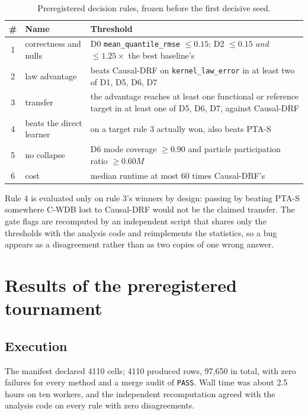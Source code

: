 \documentclass[11pt,a4paper]{article}
\theoremstyle{definition}
\theoremstyle{remark}
\newcommand{\CWDB}{\textsf{C-WDB}}
\begin{document}
\begin{table}[htbp]
\centering
\caption{Preregistered decision rules, frozen before the first decisive seed.}
\label{tab:rules}
\small
\begin{tabular}{@{}clp{9.4cm}@{}}
\toprule
\# & Name & Threshold \\
\midrule
1 & correctness and nulls & D0 \texttt{mean\_quantile\_rmse} $\leq 0.15$; D2 $\leq 0.15$ \emph{and} $\leq 1.25\times$ the best baseline's \\
2 & law advantage & beats Causal-DRF on \texttt{kernel\_law\_error} in at least two of D1, D5, D6, D7 \\
3 & transfer & the advantage reaches at least one functional or reference target in at least one of D5, D6, D7, against Causal-DRF \\
4 & beats the direct learner & on a target rule 3 actually won, also beats PTA-S \\
5 & no collapse & D6 mode coverage $\geq 0.90$ and particle participation ratio $\geq 0.60 M$ \\
6 & cost & median runtime at most 60 times Causal-DRF's \\
\bottomrule
\end{tabular}
\end{table}

Rule 4 is evaluated only on rule 3's winners by design: passing by beating PTA-S
somewhere \CWDB{} lost to Causal-DRF would not be the claimed transfer. The gate
flags are recomputed by an independent script that shares only the thresholds
with the analysis code and reimplements the statistics, so a bug appears as a
disagreement rather than as two copies of one wrong answer.

\section{Results of the preregistered tournament}
\label{sec:tournament}

\subsection{Execution}

The manifest declared 4110 cells; 4110 produced rows, 97{,}650 in total, with
zero failures for every method and a merge audit of \texttt{PASS}. Wall time was
about 2.5 hours on ten workers, and the independent recomputation agreed with the
analysis code on every rule with zero disagreements.
\end{document}
